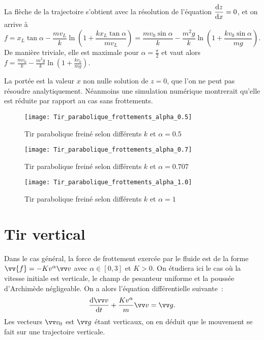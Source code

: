 La flèche de la trajectoire s'obtient avec la résolution de l'équation \(\dfrac{\mathrm{d} z}{\mathrm{d} x}=0\), et on arrive à
\begin{equation}
  f = x_L \tan \alpha - \frac{mv_L}{k}\ln\left(1 + \frac{k x_L \tan \alpha}{m v_L}\right) = \frac{m v_0 \sin \alpha}{k} - \frac{m^2 g}{k}\ln\left(1 + \frac{k v_0 \sin \alpha}{m g}\right).
\end{equation}
De manière triviale, elle est maximale pour \(\alpha = \frac{\pi}{2}\) et vaut alors \(f =  \frac{m v_0}{k} - \frac{m^2 g}{k}\ln\left(1 + \frac{k v_0}{m g}\right)\).

La portée est la valeur \(x\) non nulle solution de \(z=0\), que l'on ne peut pas
résoudre analytiquement. Néanmoins une simulation numérique montrerait qu'elle
est réduite par rapport au cas sans frottements. %

\begin{figure}
  \centering
  \texttt{[image: Tir\_parabolique\_frottements\_alpha\_0.5]}
  \caption{Tir parabolique freiné selon différents \(k\) et \(\alpha = 0.5\)}
  \label{fig:chutefrott1}
\end{figure}

\begin{figure}
  \centering
  \texttt{[image: Tir\_parabolique\_frottements\_alpha\_0.7]}
  \caption{Tir parabolique freiné selon différents \(k\) et \(\alpha = 0.707\)}
  \label{fig:chutefrott2}
\end{figure}

\begin{figure}
  \centering
  \texttt{[image: Tir\_parabolique\_frottements\_alpha\_1.0]}
  \caption{Tir parabolique freiné selon différents \(k\) et \(\alpha = 1\)}
  \label{fig:chutefrott3}
\end{figure}

\section{Tir vertical}
\label{chap3-sec:tirvertical}

Dans le cas général, la force de frottement exercée par le fluide est de la forme \(\vv{f}=-Kv^\alpha\vvv\) avec \(\alpha \in [0, 3]\) et \(K>0\). On étudiera ici le cas où la vitesse initiale est verticale, le champ de pesanteur uniforme et la poussée d'Archimède négligeable. On a alors l'équation différentielle suivante~:
\begin{equation}
  \derived{\vvv}{t} + \frac{Kv^\alpha}{m}\vvv = \vg.
\end{equation}
Les vecteurs \(\vvv_0\) est \(\vg\) étant verticaux, on en déduit que le mouvement se fait sur une trajectoire verticale.

